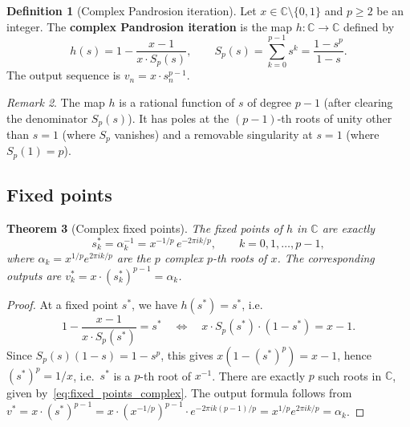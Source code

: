 \documentclass[10pt,a4paper,oneside]{book}
\newtheorem{theorem}{Theorem}[chapter]
\theoremstyle{definition}
\newtheorem{definition}[theorem]{Definition}
\theoremstyle{remark}
\newtheorem{remark}[theorem]{Remark}
\newcommand{\CC}{\mathbb{C}}
\begin{document}
\begin{definition}[Complex Pandrosion iteration]
\label{def:complex_pandrosion}
Let $x \in \CC \setminus \{0,1\}$ and $p \geq 2$ be an integer.  The \textbf{complex Pandrosion iteration} is the map $h : \CC \to \CC$ defined by
\begin{equation}
  \label{eq:complex_pandrosion}
  h(s) = 1 - \frac{x-1}{x \cdot S_p(s)},
  \qquad
  S_p(s) = \sum_{k=0}^{p-1} s^k = \frac{1 - s^p}{1 - s}.
\end{equation}
The output sequence is $v_n = x \cdot s_n^{p-1}$.
\end{definition}

\begin{remark}
The map $h$ is a rational function of $s$ of degree $p-1$ (after clearing the denominator $S_p(s)$).  It has poles at the $(p-1)$-th roots of unity other than $s = 1$ (where $S_p$ vanishes) and a removable singularity at $s = 1$ (where $S_p(1) = p$).
\end{remark}

\subsection{Fixed points}

\begin{theorem}[Complex fixed points]
\label{thm:complex_fixed_points}
The fixed points of $h$ in $\CC$ are exactly
\begin{equation}
  \label{eq:fixed_points_complex}
  s_k^* = \alpha_k^{-1} = x^{-1/p}\, e^{-2\pi i k/p},
  \qquad k = 0, 1, \ldots, p-1,
\end{equation}
where $\alpha_k = x^{1/p} e^{2\pi ik/p}$ are the $p$ complex $p$-th roots of $x$.  The corresponding outputs are $v_k^* = x \cdot (s_k^*)^{p-1} = \alpha_k$.
\end{theorem}

\begin{proof}
At a fixed point $s^*$, we have $h(s^*) = s^*$, i.e.\
\[
  1 - \frac{x-1}{x \cdot S_p(s^*)} = s^*
  \quad \Longleftrightarrow \quad
  x \cdot S_p(s^*) \cdot (1 - s^*) = x - 1.
\]
Since $S_p(s)(1-s) = 1 - s^p$, this gives $x(1 - (s^*)^p) = x - 1$, hence $(s^*)^p = 1/x$, i.e.\ $s^*$ is a $p$-th root of $x^{-1}$.  There are exactly $p$ such roots in $\CC$, given by~\eqref{eq:fixed_points_complex}.  The output formula follows from $v^* = x \cdot (s^*)^{p-1} = x \cdot (x^{-1/p})^{p-1} \cdot e^{-2\pi ik(p-1)/p} = x^{1/p} e^{2\pi ik/p} = \alpha_k$.
\end{proof}
\end{document}
